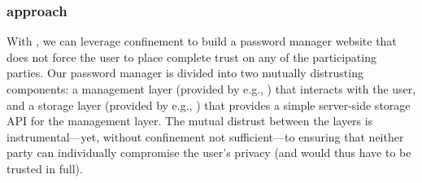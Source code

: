 \subsubsection{\sys{} approach}
%
With \sys{}, we can leverage confinement to build a password manager
website that does not force the user to place complete trust on 
any of the participating parties.
%
Our password manager is divided into two mutually distrusting
components: a management layer (provided by e.g., )
that interacts with the user, 
and a storage layer (provided by e.g., ) that provides a
simple
server-side storage API for the
management layer.
%
The mutual distrust between the layers is instrumental---yet, without
confinement not sufficient---to ensuring that neither party can
individually compromise the user's privacy (and would thus have to be
trusted in full).
%

